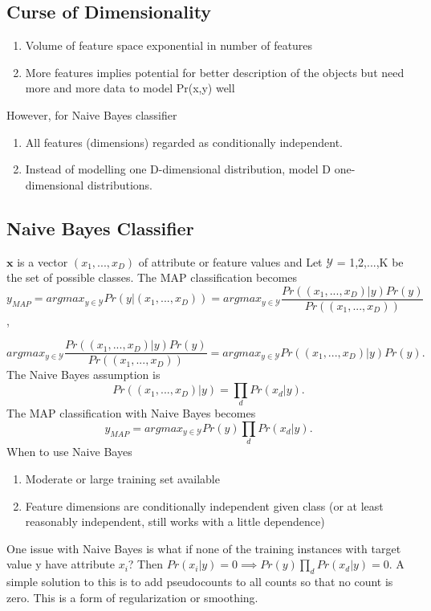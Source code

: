 \documentclass[12pt]{article}
\numberwithin{equation}{section}
\begin{document}
\subsection{Curse of Dimensionality}
\begin{enumerate}
\item Volume of feature space exponential in number of features
\item More features implies potential for better description of the objects but need more and more data to model Pr(x,y) well
\end{enumerate}
However, for Naive Bayes classifier
\begin{enumerate}
\item All features (dimensions) regarded as conditionally independent.
\item Instead of modelling one D-dimensional distribution, model D one-dimensional distributions.
\end{enumerate}

\subsection{Naive Bayes Classifier}
$\bm{x}$ is a vector $(x_1, . . . , x_D)$ of attribute or feature values and Let $\mathcal{Y}$ = {1,2,...,K} be the set of possible classes. The MAP classification becomes
\begin{equation}
y_{MAP} = arg max_{y \in \mathcal{Y} } Pr(y | (x_1, . . . , x_D) ) = arg max_{y \in \mathcal{Y} } \frac{Pr((x_1, . . . , x_D) | y ) Pr( y )   }{Pr((x_1, . . . , x_D) ) } \end{equation},

\begin{equation}
arg max_{y \in \mathcal{Y} } \frac{Pr((x_1, . . . , x_D) | y ) Pr( y )   }{Pr((x_1, . . . , x_D) ) } =   arg max_{y \in \mathcal{Y} } Pr((x_1, . . . , x_D) | y ) Pr( y ).
\end{equation}
The Naive Bayes assumption is 
\begin{equation}
Pr((x_1, . . . , x_D) | y )  = \prod_d Pr(x_d | y).
\end{equation}
The MAP classification with Naive Bayes becomes
\begin{equation}
y_{MAP} = arg max_{y \in \mathcal{Y} } Pr(y )  \prod_d Pr(x_d | y).
\end{equation}
When to use Naive Bayes

\begin{enumerate}
\item Moderate or large training set available
\item Feature dimensions are conditionally independent given class (or at least reasonably independent, still works with a little dependence)
\end{enumerate}
One issue with Naive Bayes is what if none of the training instances with target value y have attribute $x_i$? Then $Pr(x_i|y ) = 0 \implies Pr(y )\prod_d Pr(x_d | y) = 0 $. A simple solution to this is to add pseudocounts to all counts so that no count is zero. This is a form of regularization or smoothing.
\end{document}
